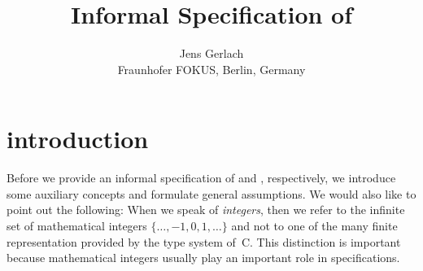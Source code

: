 \documentclass[paper=a4,DIV16,oneside,lefteqn]{scrartcl}
\title{Informal Specification of \bitwalker}
\author{Jens Gerlach\\
        {\small Fraunhofer FOKUS, Berlin, Germany}
       }
\date{}
\begin{document}
\maketitle

\section{introduction}

Before we provide an informal specification of \peek and \poke, respectively,
we introduce some auxiliary concepts and formulate general assumptions.
We would also like to point out the following:
When we speak of \emph{integers}, then we refer to the infinite set of mathematical
integers $\{\ldots, -1, 0, 1, \ldots\}$
and not to one of the many finite representation provided by the type system of~C.
This distinction is important because mathematical integers
usually play an important role in \acsl specifications.



\end{document}
